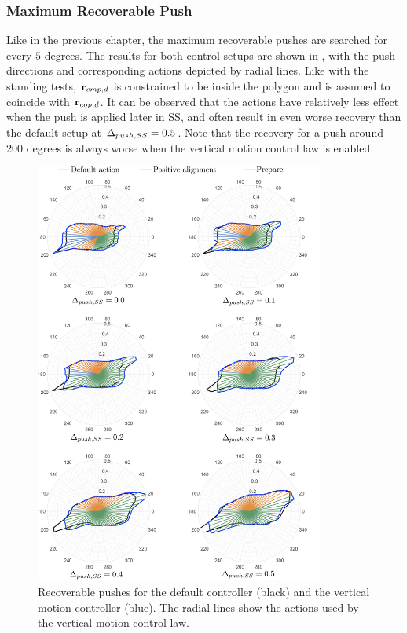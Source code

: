 \subsubsection{Maximum Recoverable Push}
Like in the previous chapter,  the maximum recoverable pushes are searched for every $5$ degrees. The results for both control setups are shown in , with the push directions and corresponding actions depicted by radial lines. Like with the standing tests, $\mathbf{r}_{cmp,d}$ is constrained to be inside the polygon and is assumed to coincide with $\mathbf{r}_{cop,d}$. It can be observed that the actions have relatively less effect when the push is applied later in \ac{SS}, and often result in even worse recovery than the default setup at $\Delta_{push,SS}=0.5$. Note that the recovery for a push around $200$ degrees is always worse when the vertical motion control law is enabled.
\begin{figure}
     \centering
        \includegraphics[width=0.85\textwidth]{STYLESTUFF/rounActions.png}
    \caption{Recoverable pushes for the default controller (black) and the vertical motion controller (blue). The radial lines show the actions used by the vertical motion control law.}
    \label{fig:roundPushActions}
\end{figure}
